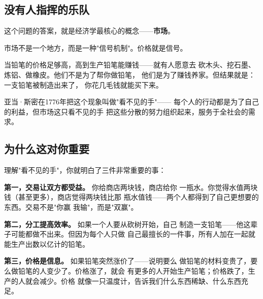 \documentclass[a4paper,12pt]{ctexart}
\begin{document}
\subsection{没有人指挥的乐队}

这个问题的答案，就是经济学最核心的概念——\textbf{市场}。

市场不是一个地方，而是一种"信号机制"。价格就是信号。

当铅笔的价格足够高，高到生产铅笔能赚钱——就有人愿意去
砍木头、挖石墨、炼铝、做橡皮。他们不是为了帮你做铅笔，
他们是为了赚钱养家。但结果就是：一支铅笔被制造出来了，
你花几毛钱就能买下来。

亚当·斯密在1776年把这个现象叫做"看不见的手"——
每个人的行动都是为了自己的利益，但市场这只看不见的手
把这些分散的努力组织起来，服务于全社会的需求。

\begin{center}
\end{center}

\subsection{为什么这对你重要}

理解"看不见的手"，你就明白了三件非常重要的事：

\textbf{第一，交易让双方都受益。} 你给商店两块钱，商店给你
一瓶水。你觉得水值两块钱（甚至更多），商店觉得两块钱比那
瓶水值钱——两个人都得到了自己更想要的东西。交易不是"你赢
我输"，而是"双赢"。

\textbf{第二，分工提高效率。} 如果一个人要从砍树开始，自己
制造一支铅笔——他这辈子可能都做不出来。但因为每个人只做
自己最擅长的一件事，所有人加在一起就能生产出数以亿计的铅笔。

\textbf{第三，价格是信息。} 如果铅笔突然涨价了——说明要么
做铅笔的材料变贵了，要么做铅笔的人变少了。价格涨了，就会
有更多的人开始生产铅笔；价格跌了，生产的人就会减少。价格
就像一只温度计，告诉我们什么东西稀缺、什么东西充足。

\begin{center}
\end{center}
\end{document}

